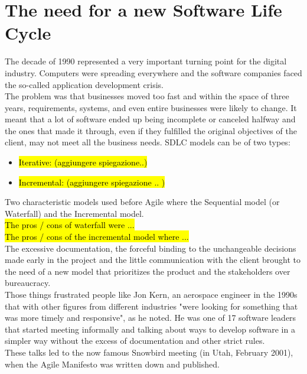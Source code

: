 \section{The need for a new Software Life Cycle}
	The decade of 1990 represented a very important turning point for the digital industry.
	Computers were spreading everywhere and the software companies faced the so-called application development crisis.\\
	The problem was that businesses moved too fast and within the space of three years, requirements, systems, and even entire businesses were likely to change. 
	It meant that a lot of software ended up being incomplete or canceled halfway and the ones that made it through, even if they fulfilled the original objectives of the client, may not meet all the business needs.
	SDLC models can be of two types:
	\begin{itemize}
		\item \hl{Iterative: (aggiungere spiegazione..)}
		\item \hl{Incremental: (aggiungere spiegazione .. )}
	\end{itemize}
	Two characteristic models used before Agile where the Sequential model (or Waterfall) and the Incremental model.\\
	\hl{The pros / cons of waterfall were ... \\
	The pros / cons of the incremental model where ...}\\
	The excessive documentation, the forceful binding to the unchangeable decisions made early in the project and the little communication with the client brought to the need of a new model that prioritizes the product and the stakeholders over bureaucracy.\\
	Those things frustrated people like Jon Kern, an aerospace engineer in the 1990s that with other figures from different industries "were looking for something that was more timely and responsive", as he noted.
	He was one of 17 software leaders that started meeting informally and talking about ways to develop software in a simpler way without the excess of documentation and other strict rules.\\
	These talks led to the now famous Snowbird meeting (in Utah, February 2001), when the Agile Manifesto was written down and published.

